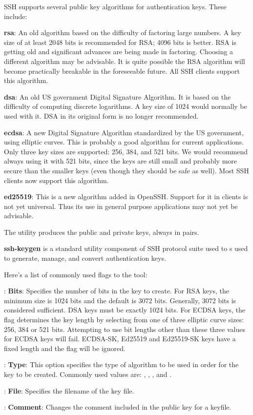SSH supports several public key algorithms for authentication keys. These include:
\bit
\item \textbf{rsa}: An old algorithm based on the difficulty of factoring large numbers. A key size of at least 2048
bits is recommended for RSA; 4096 bits is better. RSA is getting old and significant advances are being made in
factoring. Choosing a different algorithm may be advisable. It is quite possible the RSA algorithm will become
practically breakable in the foreseeable future. All SSH clients support this algorithm.
\item \textbf{dsa}: An old US government Digital Signature Algorithm. It is based on the difficulty of computing
discrete logarithms. A key size of 1024 would normally be used with it. DSA in its original form is no longer
recommended.
\item \textbf{ecdsa}: A new Digital Signature Algorithm standardized by the US government, using elliptic curves. This
is probably a good algorithm for current applications. Only three key sizes are supported: 256, 384, and 521 bits. We
would recommend always using it with 521 bits, since the keys are still small and probably more secure than the smaller
keys (even though they should be safe as well). Most SSH clients now support this algorithm.
\item \textbf{ed25519}: This is a new algorithm added in OpenSSH. Support for it in clients is not yet universal.
Thus its use in general purpose applications may not yet be advisable.
\eit

The  utility produces the public and private keys, always in pairs.

\textbf{ssh-keygen} is a standard utility component of SSH protocol suite used to s used to generate, manage, and
convert authentication keys.
\ed

Here's a list of commonly used flags to the  tool:
\bit
\item {}: \textbf{Bits}: Specifies the number of bits in the key to create. For RSA keys, the minimum size is
1024 bits and the default is 3072 bits. Generally, 3072 bits is considered sufficient. DSA keys must be exactly 1024
bits. For ECDSA keys, the flag determines the key length by selecting from one of three elliptic curve sizes: 256,
384 or 521 bits. Attempting to use bit lengths other than these three values for ECDSA keys will fail. ECDSA-SK,
Ed25519 and Ed25519-SK keys have a fixed length and the flag will be ignored.
\item {}: \textbf{Type}: This option specifies the type of algorithm to be used in order for the key to be
created. Commonly used values are: , , , and .
\item {}: \textbf{File}: Specifies the filename of the key file.
\item {}: \textbf{Comment}: Changes the comment included in the public key for a keyfile.
\eit

